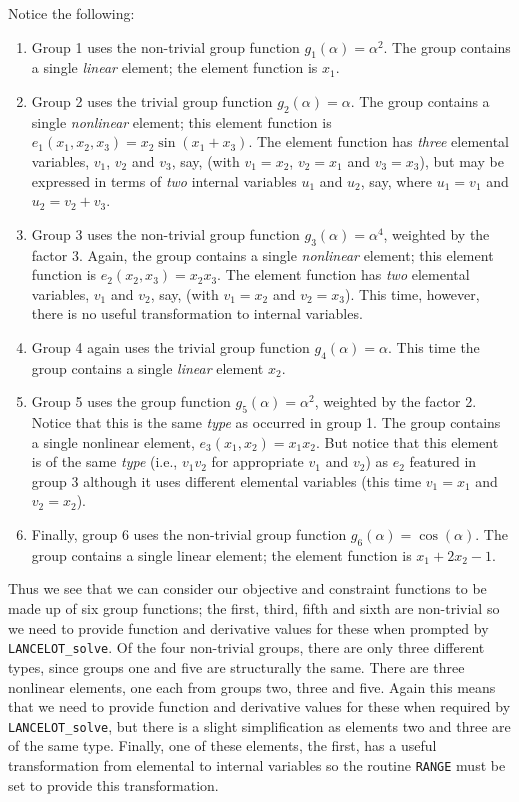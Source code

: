 \documentclass{galahad}
\newcommand{\fullpackagename}{LANC\-E\-LOT}
\newcommand{\solver}{{\tt \fullpackagename\_solve}}
\begin{document}
Notice the following:
\begin{enumerate}
\item
Group 1 uses the non-trivial
   group function $g_1(\alpha) = \alpha^2$.
   The group contains a single {\em linear} element;
   the element function is $x_1$.

\item
Group 2 uses the trivial
   group function $g_2(\alpha) = \alpha$.
   The group contains a single {\em nonlinear} element;
   this element function is $e_1(x_1,x_2,x_3) = x_2 \sin( x_1 + x_3 )$.
   The element function has {\em three} elemental variables,
   $v_1$, $v_2$ and $v_3$, say, (with $v_1 = x_2$,
   $v_2 = x_1$ and $v_3 = x_3$), but may
   be expressed in terms of {\em two} internal variables
   $u_1$ and $u_2$, say, where
   $u_1 = v_1$ and $u_2 = v_2 + v_3$.

\item
Group 3 uses the non-trivial
   group function $g_3( \alpha ) = \alpha^4$, weighted by the
   factor 3.
   Again, the group contains a single {\em nonlinear} element;
   this element function is $e_2(x_2,x_3) = x_2 x_3$.
   The element function has {\em two} elemental variables,
   $v_1$ and $v_2$, say, (with $v_1 = x_2$ and
   $v_2 = x_3$). This time, however, there is no useful
   transformation to internal variables.

\item
Group 4 again uses the trivial
   group function $g_4(\alpha ) = \alpha$.
   This time the group contains a single {\em linear} element
   $x_2$.

\item
Group 5 uses the
   group function $g_5(\alpha ) = \alpha^2$, weighted by the factor 2.
   Notice that this is the same {\em type} as occurred in group 1.
   The group contains a single nonlinear element, $e_3(x_1,x_2) = x_1x_2$.
   But notice that this element is of the same {\em type} (i.e., $v_1 v_2$
   for appropriate $v_1$ and $v_2$) as $e_2$ featured in group 3
   although it uses different elemental variables (this time
   $v_1 = x_1$ and $v_2 = x_2$).
\item
Finally, group 6 uses the non-trivial
   group function $g_6(\alpha) = \cos(\alpha)$.
   The group contains a single {linear} element;
   the element function is $x_1 + 2 x_2 - 1$.
\end{enumerate}

Thus we see that we can consider our objective
and constraint
functions to be made up of six group functions;
the first, third, fifth and sixth are non-trivial
so we need to provide function and derivative values for these when
prompted by \solver. Of the four non-trivial groups, there are only
three different types, since groups one and five are structurally the same.
There are three nonlinear elements, one each from groups two, three and five.
Again this means that we need to provide function and derivative
values for these when required by \solver, but there is a slight
simplification as elements two and three are of the same type.
Finally, one of these elements, the first,
has a useful transformation from elemental to internal variables
so the routine {\tt RANGE} must be set to provide this transformation.
\end{document}
